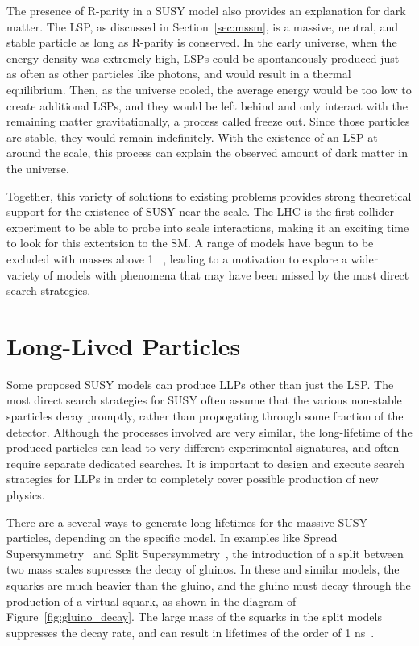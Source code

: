The presence of R-parity in a \ac{SUSY} model also provides an explanation for dark matter.
The \ac{LSP}, as discussed in Section~\ref{sec:mssm}, is a massive, neutral, and stable particle as long as R-parity is conserved.
In the early universe, when the energy density was extremely high, \acp{LSP} could be spontaneously produced just as often as other particles like photons, and would result in a thermal equilibrium.
Then, as the universe cooled, the average energy would be too low to create additional \acp{LSP}, and they would be left behind and only interact with the remaining matter gravitationally, a process called freeze out.
Since those particles are stable, they would remain indefinitely. 
With the existence of an \ac{LSP} at around the \TeV scale, this process can explain the observed amount of dark matter in the universe.

Together, this variety of solutions to existing problems provides strong theoretical support for the existence of \ac{SUSY} near the \TeV scale.
The \ac{LHC} is the first collider experiment to be able to probe into \TeV scale interactions, making it an exciting time to look for this extentsion to the \ac{SM}.
A range of models have begun to be excluded with masses above 1 \TeV~\cite{pdg}, leading to a motivation to explore a wider variety of models with phenomena that may have been missed by the most direct search strategies.

\section{Long-Lived Particles}
\label{sec:llp_theory}

Some proposed \ac{SUSY} models can produce \acp{LLP} other than just the \ac{LSP}.
The most direct search strategies for \ac{SUSY} often assume that the various non-stable sparticles decay promptly, rather than propogating through some fraction of the detector.
Although the processes involved are very similar, the long-lifetime of the produced particles can lead to very different experimental signatures, and often require separate dedicated searches.
It is important to design and execute search strategies for \acp{LLP} in order to completely cover possible production of new physics. 

There are a several ways to generate long lifetimes for the massive \ac{SUSY} particles, depending on the specific model.
In examples like Spread Supersymmetry~\cite{spreadsusy} and Split Supersymmetry~\cite{split1,split2}, the introduction of a split between two mass scales supresses the decay of gluinos.
In these and similar models, the squarks are much heavier than the gluino, and the gluino must decay through the production of a virtual squark, as shown in the diagram of Figure~\ref{fig:gluino_decay}.
The large mass of the squarks in the split models suppresses the decay rate, and can result in lifetimes of the order of 1 ns~\cite{spreadsusy}.

